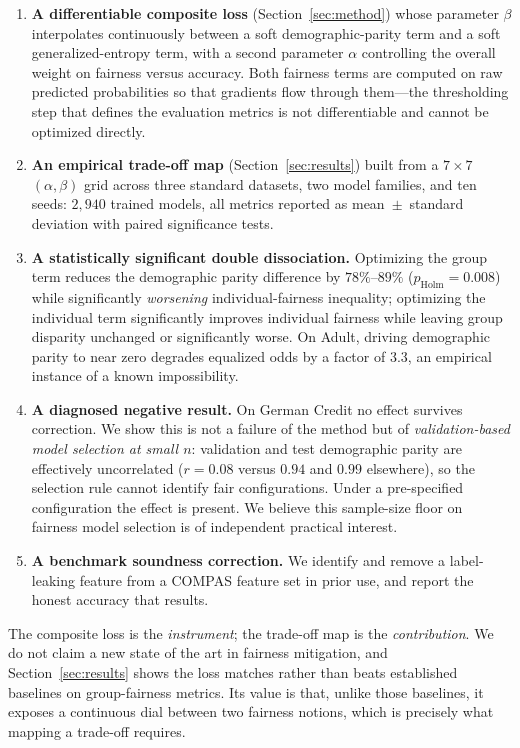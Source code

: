 \begin{enumerate}
\item \textbf{A differentiable composite loss} (Section~\ref{sec:method}) whose
      parameter $\beta$ interpolates continuously between a soft
      demographic-parity term and a soft generalized-entropy term, with a
      second parameter $\alpha$ controlling the overall weight on fairness
      versus accuracy. Both fairness terms are computed on raw predicted
      probabilities so that gradients flow through them---the thresholding
      step that defines the evaluation metrics is not differentiable and
      cannot be optimized directly.
\item \textbf{An empirical trade-off map} (Section~\ref{sec:results}) built
      from a $7\times7$ $(\alpha,\beta)$ grid across three standard datasets,
      two model families, and ten seeds: $2{,}940$ trained models, all metrics
      reported as mean~$\pm$~standard deviation with paired significance tests.
\item \textbf{A statistically significant double dissociation.} Optimizing the
      group term reduces the demographic parity difference by $78\%$--$89\%$
      ($p_{\text{Holm}}=0.008$) while significantly \emph{worsening}
      individual-fairness inequality; optimizing the individual term
      significantly improves individual fairness while leaving group disparity
      unchanged or significantly worse. On Adult, driving demographic parity
      to near zero degrades equalized odds by a factor of $3.3$, an empirical
      instance of a known impossibility.
\item \textbf{A diagnosed negative result.} On German Credit no effect
      survives correction. We show this is not a failure of the method but of
      \emph{validation-based model selection at small $n$}: validation and
      test demographic parity are effectively uncorrelated
      ($r=0.08$ versus $0.94$ and $0.99$ elsewhere), so the selection rule
      cannot identify fair configurations. Under a pre-specified
      configuration the effect is present. We believe this sample-size floor
      on fairness model selection is of independent practical interest.
\item \textbf{A benchmark soundness correction.} We identify and remove a
      label-leaking feature from a COMPAS feature set in prior use, and report
      the honest accuracy that results.
\end{enumerate}

The composite loss is the \emph{instrument}; the trade-off map is the
\emph{contribution}. We do not claim a new state of the art in fairness
mitigation, and Section~\ref{sec:results} shows the loss matches rather than
beats established baselines on group-fairness metrics. Its value is that,
unlike those baselines, it exposes a continuous dial between two fairness
notions, which is precisely what mapping a trade-off requires.
